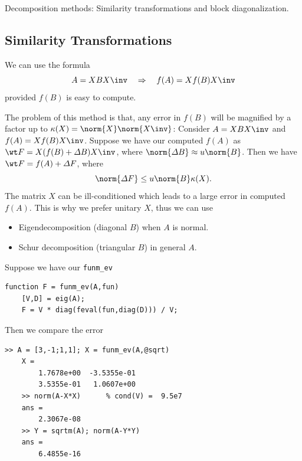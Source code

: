 \documentclass{article}
\begin{document}
\begin{mybox}
    {} Decomposition methods: Similarity transformations and block
    diagonalization.
\end{mybox}

\subsection{Similarity Transformations}
We can use the formula 
\begin{equation}\notag
    A = XBX\inv \quad\Rightarrow\quad f(A) = Xf(B)X\inv
\end{equation}
provided $f(B)$ is easy to compute. 

The problem of this method is that, any error in $f(B)$ will be
magnified by a factor up to $\kappa(X) = \norm{X}\norm{X\inv}$: Consider
$A = XBX\inv$ and $f(A) = Xf(B) X\inv$. Suppose we have our computed
$f(A)$ as $\wt F = X(f(B) + \varDelta B)X\inv$, where $\norm{\varDelta
B} \approx u\norm{B}$. Then we have $\wt F = f(A) + \varDelta F$, where 
\begin{equation}\notag
    \norm{\varDelta F} \leq u \norm{B} \kappa(X).
\end{equation}
The matrix $X$ can be ill-conditioned which leads to a large error in
computed $f(A)$. This is why we prefer unitary $X$, thus we can use 
\begin{itemize}
    \item Eigendecomposition (diagonal $B$) when $A$ is normal.
    \item Schur decomposition (triangular $B$) in general $A$.
\end{itemize}

\begin{example}
    Suppose we have our \texttt{funm\_ev}
\begin{lstlisting}[numbers=none]
    function F = funm_ev(A,fun) 
    [V,D] = eig(A); 
    F = V * diag(feval(fun,diag(D))) / V;
\end{lstlisting}
Then we compare the error
\begin{lstlisting}[numbers=none]
    >> A = [3,-1;1,1]; X = funm_ev(A,@sqrt) 
    X = 
        1.7678e+00  -3.5355e-01
        3.5355e-01   1.0607e+00 
    >> norm(A-X*X)      % cond(V) =  9.5e7
    ans = 
        2.3067e-08 
    >> Y = sqrtm(A); norm(A-Y*Y) 
    ans = 
        6.4855e-16
\end{lstlisting}
\end{example}
\end{document}
